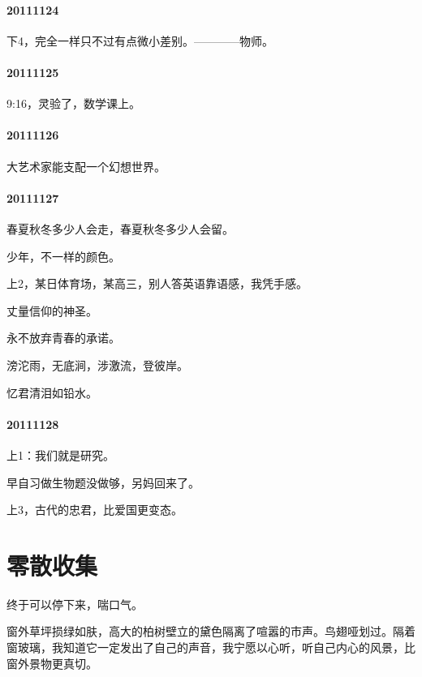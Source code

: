 \documentclass[UTF8]{Diaries}
\begin{document}
\paragraph{20111124}

下4，完全一样只不过有点微小差别。————物师。


\paragraph{20111125}

9:16，灵验了，数学课上。


\paragraph{20111126}

大艺术家能支配一个幻想世界。


\paragraph{20111127}

春夏秋冬多少人会走，春夏秋冬多少人会留。

少年，不一样的颜色。

上2，某日体育场，某高三，别人答英语靠语感，我凭手感。

丈量信仰的神圣。

永不放弃青春的承诺。

滂沱雨，无底涧，涉激流，登彼岸。

忆君清泪如铅水。



\paragraph{20111128}

上1：我们就是研究。

早自习做生物题没做够，另妈回来了。

上3，古代的忠君，比爱国更变态。



\section{零散收集}

终于可以停下来，喘口气。

窗外草坪损绿如肤，高大的柏树壁立的黛色隔离了喧嚣的市声。鸟翅哑划过。隔着窗玻璃，我知道它一定发出了自己的声音，我宁愿以心听，听自己内心的风景，比窗外景物更真切。
\end{document}
